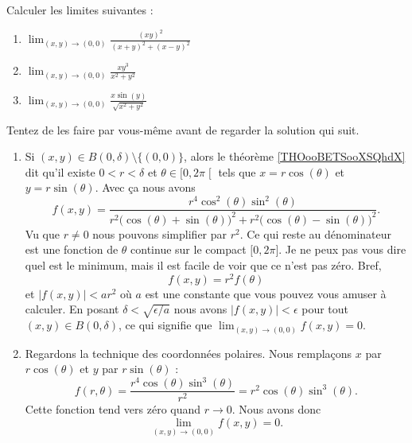 \begin{example}     \label{EXooBEROooPhPsSU}
	Calculer les limites suivantes :
	\begin{enumerate}
		\item
		      \( \lim_{(x,y)\to(0,0)}\frac{ (xy)^2 }{ (x+y)^2+(x-y)^2 }\)
		\item
		      \( \lim_{(x,y)\to(0,0)}\frac{ xy^3 }{ x^2+y^2 }\)
		\item
		      \( \lim_{(x,y)\to(0,0)}\frac{ x\sin(y) }{ \sqrt{x^2+y^2} }\)
	\end{enumerate}

	Tentez de les faire par vous-même avant de regarder la solution qui suit.
	\begin{enumerate}
		\item
		      Si \( (x,y)\in B(0,\delta)\setminus\{ (0,0) \}\), alors le théorème \ref{THOooBETSooXSQhdX} dit qu'il existe \( 0<r<\delta\) et \( \theta\in\mathopen[ 0 , 2\pi \mathclose[\) tels que \( x=r\cos(\theta)\) et \( y=r\sin(\theta)\). Avec ça nous avons
		      \begin{equation}
			      f(x,y)=\frac{ r^{4}\cos^2(\theta)\sin^2(\theta) }{ r^2\big( \cos(\theta)+\sin(\theta) \big)^2+r^2\big( \cos(\theta)-\sin(\theta) \big)^2}.
		      \end{equation}
		      Vu que \( r\neq 0\) nous pouvons simplifier par \( r^2\). Ce qui reste au dénominateur est une fonction de \( \theta\) continue sur le compact \( \mathopen[ 0 , 2\pi \mathclose] \). Je ne peux pas vous dire quel est le minimum, mais il est facile de voir que ce n'est pas zéro. Bref,
		      \begin{equation}
			      f(x,y)=r^2f(\theta)
		      \end{equation}
		      et \( | f(x,y) |<ar^2\) où \( a\) est une constante que vous pouvez vous amuser à calculer. En posant \( \delta<\sqrt{ \epsilon/a }\) nous avons \( | f(x,y) |<\epsilon\) pour tout \( (x,y)\in B(0,\delta)\), ce qui signifie que \( \lim_{(x,y)\to (0,0)} f(x,y)=0\).
		\item
		      Regardons la technique des coordonnées polaires. Nous remplaçons \( x\) par \( r\cos(\theta)\) et \( y\) par \( r\sin(\theta)\) :
		      \begin{equation}
			      f(r,\theta)=\frac{ r^4\cos(\theta)\sin^3(\theta) }{ r^2 }=r^2\cos(\theta)\sin^3(\theta).
		      \end{equation}
		      Cette fonction tend vers zéro quand \( r\to 0\). Nous avons donc
		      \begin{equation}
			      \lim_{(x,y)\to(0,0)}f(x,y)=0.
		      \end{equation}


\end{enumerate}
\end{example}
